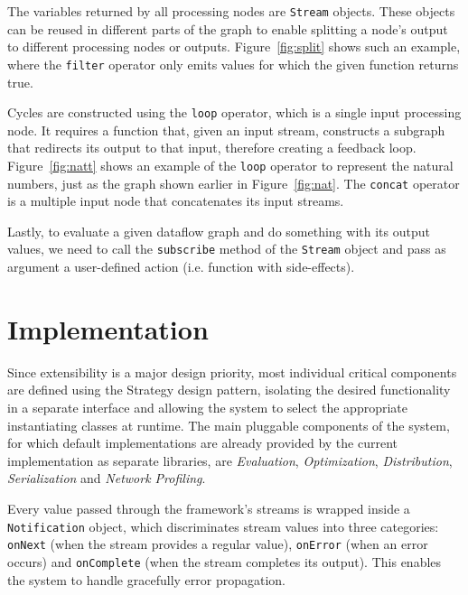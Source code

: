 \documentclass[sigplan,screen,review,anonymous]{acmart}
\begin{document}
The variables returned by all processing nodes are \texttt{Stream} objects. These
objects can be reused in different parts of the graph to enable splitting a
node's output to different processing nodes or outputs. Figure~\ref{fig:split}
shows such an example, where the \texttt{filter} operator only emits values for
which the given function returns true.

Cycles are constructed using the \texttt{loop} operator, which is a single
input processing node. It requires a function that, given an input stream,
constructs a subgraph that redirects its output to that input, therefore
creating a feedback loop. Figure~\ref{fig:natt} shows an example of the
\texttt{loop} operator to represent the natural numbers, just as the graph
shown earlier in Figure~\ref{fig:nat}. The \texttt{concat} operator is a
multiple input node that concatenates its input streams.


Lastly, to evaluate a given dataflow graph and do something with its output values, we
need to call the \texttt{subscribe} method of the \texttt{Stream} object and pass as argument
a user-defined action (i.e. function with side-effects).
%

\section{Implementation} \label{sec:implementation}

Since extensibility is a major design priority, most individual critical
components are defined using the Strategy design pattern, isolating the desired
functionality in a separate interface and allowing the system to select the
appropriate instantiating classes at runtime. The main pluggable components of
the system, for which default implementations are already provided by the
current implementation as separate libraries, are \textit{Evaluation},
\textit{Optimization}, \textit{Distribution}, \textit{Serialization} and
\textit{Network Profiling}.

Every value passed through the framework's streams is wrapped inside a
\texttt{Notification} object, which discriminates stream values into three
categories: \texttt{onNext} (when the stream provides a regular value),
\texttt{onError} (when an error occurs) and \texttt{onComplete} (when the
stream completes its output). This enables the system to handle gracefully
error propagation.
\end{document}
